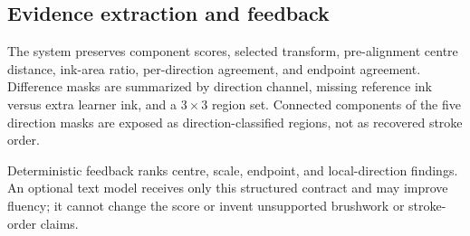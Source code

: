 \subsection{Evidence extraction and feedback}

The system preserves component scores, selected transform, pre-alignment
centre distance, ink-area ratio, per-direction agreement, and endpoint
agreement. Difference masks are summarized by direction channel, missing
reference ink versus extra learner ink, and a \(3\times3\) region set.
Connected components of the five direction masks are exposed as
direction-classified regions, not as recovered stroke order.

Deterministic feedback ranks centre, scale, endpoint, and local-direction
findings. An optional text model receives only this structured contract and
may improve fluency; it cannot change the score or invent unsupported
brushwork or stroke-order claims.
